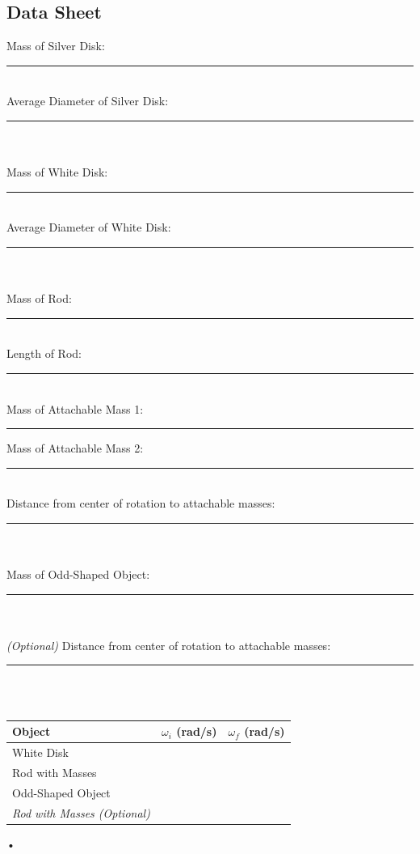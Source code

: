 \documentclass[main.tex]{subfiles}
\begin{document}
\newpage
\begin{doublespace}
\section{Data Sheet}
Mass of Silver Disk:\rule[-1mm]{2.5cm}{.1pt}\\
Average Diameter of Silver Disk:\rule[-1mm]{2.5cm}{.1pt}\\ \\
Mass of White Disk:\rule[-1mm]{2.5cm}{.1pt}\\
Average Diameter of White Disk:\rule[-1mm]{2.5cm}{.1pt}\\ \\
Mass of Rod:\rule[-1mm]{2.5cm}{.1pt}\\
Length of Rod:\rule[-1mm]{2.5cm}{.1pt}\\ 
Mass of Attachable Mass 1:\rule[-1mm]{2.5cm}{.1pt} \qquad Mass of Attachable Mass 2:\rule[-1mm]{2.5cm}{.1pt}\\
Distance from center of rotation to attachable masses:\rule[-1mm]{2.5cm}{.1pt}\\ \\
Mass of Odd-Shaped Object:\rule[-1mm]{2.5cm}{.1pt}\\ \\
\emph{(Optional)} Distance from center of rotation to attachable masses:\rule[-1mm]{2.5cm}{.1pt}\\ \\

\begin{tabular}{|l|l|l|}
\hline
Object & $\omega_i$ (rad/s) & $\omega_f$ (rad/s)\\
\hline
White Disk &&\\
\hline
Rod with Masses &&\\
\hline
Odd-Shaped Object &&\\
\hline
\emph{Rod with Masses (Optional)} &&\\
\hline
\end{tabular}•
\end{doublespace}
\end{document}
